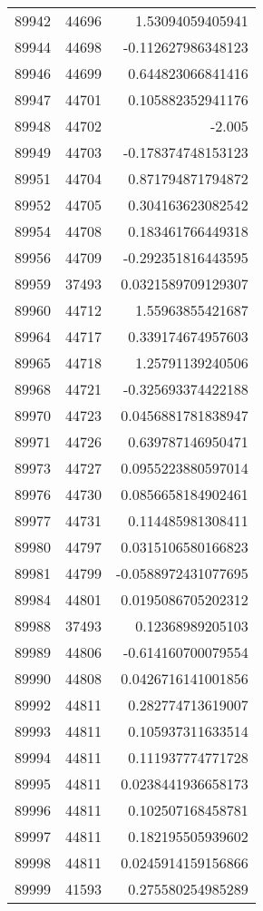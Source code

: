 \begin{tabular}{r | r | r}
89942 & 44696 & 1.53094059405941 \\
89944 & 44698 & -0.112627986348123 \\
89946 & 44699 & 0.644823066841416 \\
89947 & 44701 & 0.105882352941176 \\
89948 & 44702 & -2.005 \\
89949 & 44703 & -0.178374748153123 \\
89951 & 44704 & 0.871794871794872 \\
89952 & 44705 & 0.304163623082542 \\
89954 & 44708 & 0.183461766449318 \\
89956 & 44709 & -0.292351816443595 \\
89959 & 37493 & 0.0321589709129307 \\
89960 & 44712 & 1.55963855421687 \\
89964 & 44717 & 0.339174674957603 \\
89965 & 44718 & 1.25791139240506 \\
89968 & 44721 & -0.325693374422188 \\
89970 & 44723 & 0.0456881781838947 \\
89971 & 44726 & 0.639787146950471 \\
89973 & 44727 & 0.0955223880597014 \\
89976 & 44730 & 0.0856658184902461 \\
89977 & 44731 & 0.114485981308411 \\
89980 & 44797 & 0.0315106580166823 \\
89981 & 44799 & -0.0588972431077695 \\
89984 & 44801 & 0.0195086705202312 \\
89988 & 37493 & 0.12368989205103 \\
89989 & 44806 & -0.614160700079554 \\
89990 & 44808 & 0.0426716141001856 \\
89992 & 44811 & 0.282774713619007 \\
89993 & 44811 & 0.105937311633514 \\
89994 & 44811 & 0.111937774771728 \\
89995 & 44811 & 0.0238441936658173 \\
89996 & 44811 & 0.102507168458781 \\
89997 & 44811 & 0.182195505939602 \\
89998 & 44811 & 0.0245914159156866 \\
89999 & 41593 & 0.275580254985289 \\

\end{tabular}
